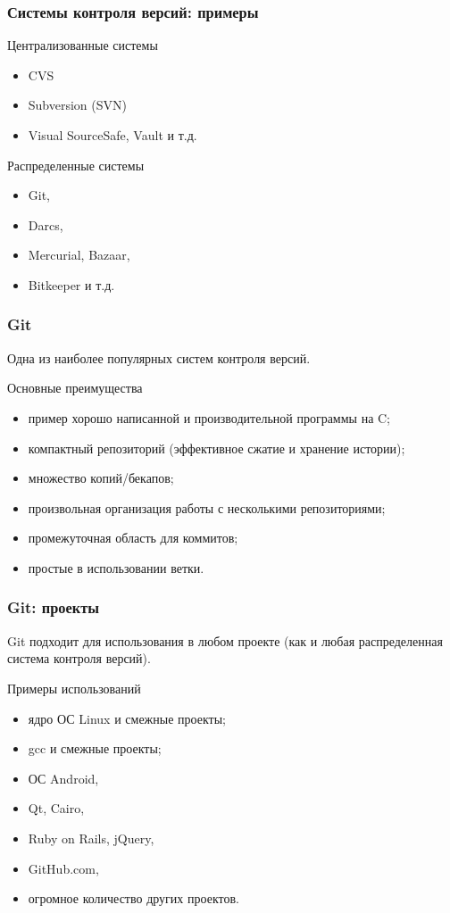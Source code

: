 \documentclass{beamer}
\begin{document}
\begin{frame}
  \frametitle{Системы контроля версий: примеры}
  \begin{block}{Централизованные системы}
    \begin{itemize}
      \item CVS
      \item Subversion (SVN)
      \item Visual SourceSafe, Vault и т.д.
    \end{itemize}
  \end{block}

  \begin{block}{Распределенные системы}
    \begin{itemize}
      \item Git,
      \item Darcs,
      \item Mercurial, Bazaar,
      \item Bitkeeper и т.д.
    \end{itemize}
  \end{block}
\end{frame}

\begin{frame}
  \frametitle{Git}
  Одна из наиболее популярных систем контроля версий.

  \begin{block}{Основные преимущества}
    \begin{itemize}
      \item пример хорошо написанной и производительной программы на C;
      \item компактный репозиторий (эффективное сжатие и хранение истории);
      \item множество копий/бекапов;
      \item произвольная организация работы с несколькими репозиториями;
      \item промежуточная область для коммитов;
      \item простые в использовании ветки.
    \end{itemize}
  \end{block}
\end{frame}

\begin{frame}
  \frametitle{Git: проекты}
  Git подходит для использования в любом проекте (как и любая
  распределенная система контроля версий).

  \begin{block}{Примеры использований}
    \begin{itemize}
      \item ядро ОС Linux и смежные проекты;
      \item gcc и смежные проекты;
      \item ОС Android,
      \item Qt, Cairo,
      \item Ruby on Rails, jQuery,
      \item GitHub.com,
      \item огромное количество других проектов.
    \end{itemize}
  \end{block}
\end{frame}
\end{document}
